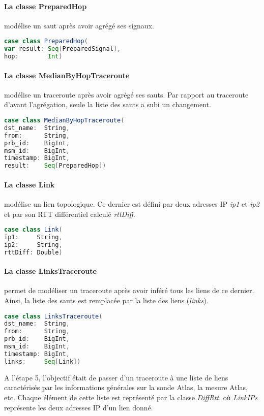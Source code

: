 \paragraph{La classe PreparedHop } modélise un saut après avoir agrégé ses signaux. 
\begin{lstlisting}[language=scala]
case class PreparedHop(
var result: Seq[PreparedSignal],
hop:        Int)
\end{lstlisting}


\paragraph{La classe MedianByHopTraceroute } modélise un traceroute après avoir agrégé ses sauts. Par rapport au traceroute d'avant l'agrégation, seule la liste des sauts  a subi un changement. 
\begin{lstlisting}[language=scala]
case class MedianByHopTraceroute(
dst_name:  String,
from:      String,
prb_id:    BigInt,
msm_id:    BigInt,
timestamp: BigInt,
result:    Seq[PreparedHop])
\end{lstlisting}


\paragraph{La classe Link} modélise un lien topologique. Ce dernier est défini par deux adresses IP  \textit{ip1} et \textit{ip2} et par son RTT différentiel calculé \textit{rttDiff}.
\begin{lstlisting}[language=scala]
case class Link(
ip1:     String,
ip2:     String,
rttDiff: Double)
\end{lstlisting}

\paragraph{La classe LinksTraceroute} permet de modéliser un traceroute après avoir inféré tous les liens de ce dernier. Ainsi, la liste des sauts est remplacée par la liste des liens (\textit{links}). 

\begin{lstlisting}[language=scala]
case class LinksTraceroute(
dst_name:  String,
from:      String,
prb_id:    BigInt,
msm_id:    BigInt,
timestamp: BigInt,
links:     Seq[Link])
\end{lstlisting}


A l'étape 5, l'objectif était de passer d'un traceroute à une liste de liens caractérisés par les informations générales sur la sonde Atlas, la mesure Atlas, etc. Chaque élément de cette liste est représenté par la classe \textit{DiffRtt}, où \textit{LinkIPs} représente les deux adresses IP d'un lien donné.
